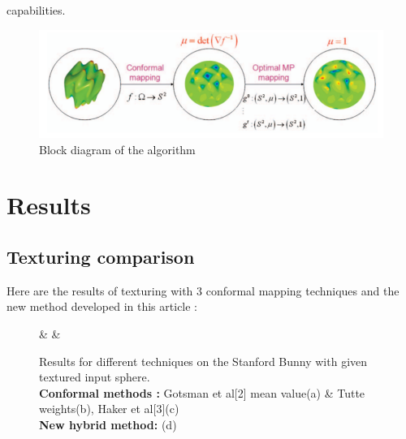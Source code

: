 capabilities.\documentclass[11pt,a4paper]{article}
\begin{document}
\begin{figure}[H]
   \centering
   \includegraphics[width=16cm]{6.png}
   \caption{Block diagram of the algorithm}
\end{figure}
\vskip 0.3cm



\clearpage
\section{Results}

\subsection{Texturing comparison}

Here are the results of texturing with 3 conformal mapping techniques and the new method developed in this article :

\begin{figure}[H]
     &
    &
    \caption{Results for different techniques on the Stanford Bunny with given textured input sphere.\\
        \textbf{Conformal methods :} Gotsman et al[2] mean value(a) \& Tutte weights(b), Haker et al[3](c)\\
        \textbf{New hybrid method:} (d)}
\end{figure}
\end{document}
